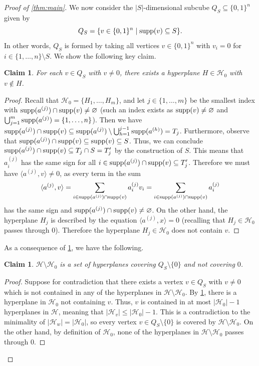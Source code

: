 \documentclass{amsart}
\newtheorem{claim}[theorem]{Claim}
\theoremstyle{remark}
\numberwithin{theorem}{section}
\renewcommand{\(}{\bigl(}
\renewcommand{\)}{\bigr)\vphantom{)}}
\newcommand{\cH}{\mathcal H}
\renewcommand{\le}{\leqslant}
\newcommand{\ang}[1]{\langle#1\rangle}
\newcommand{\bin}{\{0,1\}}
\newcommand{\supp}{\textup{supp}}
\begin{document}
\begin{proof}[Proof of \cref{thm:main}]
    We now consider the $|S|$-dimensional subcube $Q_S\subseteq \bin^n$ given by 
    \[Q_S = \{v\in \bin^n \mid \supp(v)\subseteq S\}.\]
    In other words, $Q_S$ is formed by taking all vertices $v\in \bin^n$ with $v_i=0$ for $i\in \{1,\dots,n\}\setminus S$. We show the following key claim.
    \begin{claim}\label{claim:Qs}
        For each $v\in Q_S$ with $v\ne 0$, there exists a hyperplane $H\in \cH_0$ with $v\not\in H$. 
    \end{claim}
    \begin{proof}
        Recall that $\cH_0 = \{H_{1}, \dots, H_{m}\}$, and let $j\in \{1,\dots,m\}$ be the smallest index with $\supp(a^{(j)})\cap \supp(v)\ne \varnothing$ (such an index exists as $\supp(v)\ne \varnothing$ and $\bigcup_{j=1}^m \supp(a^{(j)})= \{1,\dots, n\}$). Then we have $\supp(a^{(j)})\cap \supp(v)\subseteq \supp(a^{(j)})\setminus \bigcup_{h=1}^{j-1} \supp(a^{(h)})=T_j$. Furthermore, observe that $\supp(a^{(j)})\cap \supp(v)\subseteq \supp(v)\subseteq S$. Thus, we can conclude $\supp(a^{(j)})\cap \supp(v)\subseteq T_j\cap S= T_j'$ by the construction of $S$. This means that $a^{(j)}_{i}$ has the same sign for all $i\in \supp(a^{(j)})\cap \supp(v)\subseteq T_j'$. Therefore we must have $\ang{a^{(j)}, v}\ne 0$, as every term in the sum 
        \[\ang{a^{(j)},v} = \sum_{i\in \supp(a^{(j)})\cap \supp(v)}a^{(j)}_iv_i=\sum_{i\in \supp(a^{(j)})\cap \supp(v)}a^{(j)}_i\]
        has the same sign and $\supp(a^{(j)})\cap \supp(v)\ne \varnothing$. On the other hand, the hyperplane $H_j$ is described by the equation $\ang{a^{(j)},x}=0$ (recalling that $H_j\in \cH_0$ passes through $0$). Therefore the hyperplane $H_{j}\in \cH_0$ does not contain $v$.
    \end{proof}

    As a consequence of \cref{claim:Qs}, we have the following.

    \begin{claim}\label{claim:subcube-cover}
        $\cH\setminus \cH_0$ is a set of hyperplanes covering $Q_S\setminus\{0\}$ and not covering $0$.
    \end{claim}

    \begin{proof}
        Suppose for contradiction that there exists a vertex $v\in Q_S$ with $v\ne 0$ which is not contained in any of the hyperplanes in $\cH\setminus \cH_0$. By \cref{claim:Qs}, there is a hyperplane in $\cH_0$ not containing $v$. Thus, $v$ is contained in at most $|\cH_0| - 1$ hyperplanes in $\cH$, meaning that $|\cH_v| \le |\cH_0| - 1$. This is a contradiction to the minimality of $|\cH_w|=|\cH_0|$, so every vertex $v\in Q_S\setminus \{0\}$ is covered by $\cH\setminus \cH_0$. On the other hand, by definition of $\cH_0$, none of the hyperplanes in $\cH\setminus \cH_0$ passes through $0$.
    \end{proof}


\end{proof}
\end{document}
